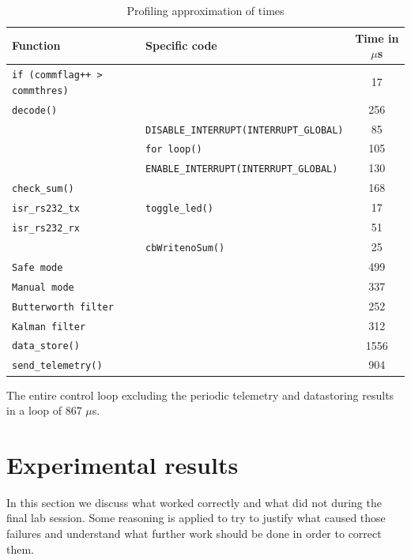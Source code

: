 \documentclass{article}
\begin{document}
\begin{table}[ht]
\centering
\begin{tabular}{|l|l|c|}
\hline 
\textbf{Function} & \textbf{Specific code} & \textbf{Time in $\mu$s} \\ 
\hline 
\texttt{if (commflag++ > commthres)} & & 17 \\
\hline
\texttt{decode()} & & 256 \\
\hline
 & \texttt{DISABLE\_INTERRUPT(INTERRUPT\_GLOBAL)} & 85 \\
 & \texttt{for loop()} & 105 \\
 & \texttt{ENABLE\_INTERRUPT(INTERRUPT\_GLOBAL)} & 130 \\
\hline
\texttt{check\_sum()} & & 168 \\
\hline
\texttt{isr\_rs232\_tx} & \texttt{toggle\_led()} & 17 \\
\hline
\texttt{isr\_rs232\_rx} & & 51 \\
\hline
 & \texttt{cbWritenoSum()} & 25 \\
\hline
\texttt{Safe mode} & & 499 \\
\hline
\texttt{Manual mode} & & 337 \\
\hline 
\texttt{Butterworth filter} & & 252 \\
\hline
\texttt{Kalman filter} & & 312 \\
\hline
\texttt{data\_store()} & & 1556 \\
\hline
\texttt{send\_telemetry()} & & 904 \\
\hline
\end{tabular} 
\caption{Profiling approximation of times}
\label{tbl:profiling}
\end{table}

The entire control loop excluding the periodic telemetry and datastoring results in a loop of 867 $\mu$s. 


\section{Experimental results}
\label{sec:results}
In this section we discuss what worked correctly and what did not during the final lab session. Some reasoning is applied to try to justify what caused those failures and understand what further work should be done in order to correct them.
\end{document}
